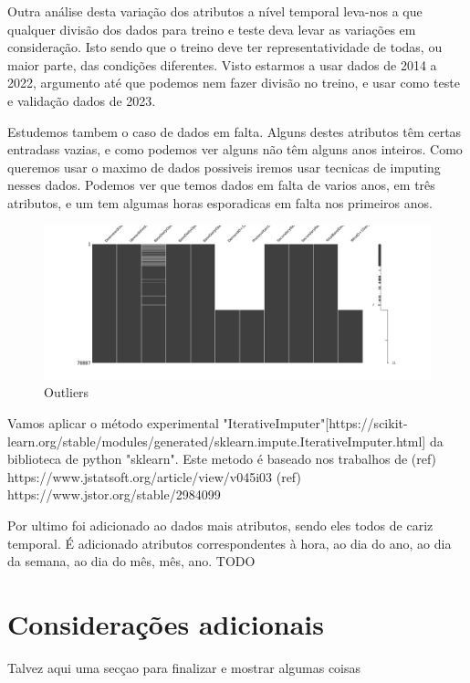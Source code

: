 Outra análise desta variação dos atributos a nível temporal leva-nos a que qualquer divisão dos dados para treino e teste deva levar as variações em consideração. Isto sendo que o treino deve ter representatividade de todas, ou maior parte, das condições diferentes.
Visto estarmos a usar dados de 2014 a 2022, argumento até que podemos nem fazer divisão no treino, e usar como teste e validação dados de 2023.


Estudemos tambem o caso de dados em falta. Alguns destes atributos têm certas entradass vazias, e como podemos ver alguns não têm alguns anos inteiros.
Como queremos usar o maximo de dados possiveis iremos usar tecnicas de imputing nesses dados.
Podemos ver que temos dados em falta de varios anos, em três atributos, e um tem algumas horas esporadicas em falta nos primeiros anos.

\begin{figure}[H]
  \centering
  \includegraphics[width=\textwidth]{../plots/missing_data.png}
  \caption{Outliers}
\end{figure}

Vamos aplicar o método experimental "IterativeImputer"[https://scikit-learn.org/stable/modules/generated/sklearn.impute.IterativeImputer.html] da biblioteca de python "sklearn".
Este metodo é baseado nos trabalhos de (ref) https://www.jstatsoft.org/article/view/v045i03 (ref) https://www.jstor.org/stable/2984099


Por ultimo foi adicionado ao dados mais atributos, sendo eles todos de cariz temporal. É adicionado atributos correspondentes à hora, ao dia do ano, ao dia da semana, ao dia do mês, mês, ano. TODO


\section{Considerações adicionais  \label{se:dados_plus}}

Talvez aqui uma secçao para finalizar e mostrar algumas coisas
